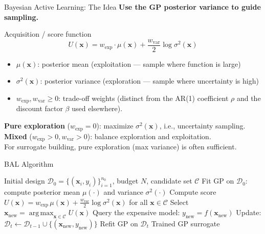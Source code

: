 \documentclass[aspectratio=169,11pt]{beamer}
\newcommand{\emphc}[1]{\textcolor{harvardcrimson}{#1}}
\newcommand{\x}{\bm{x}}
\DeclareMathOperator*{\argmax}{arg\,max}
\begin{document}
\begin{frame}{Bayesian Active Learning: The Idea}
\textbf{Use the GP posterior variance to guide sampling.}

\vspace{0.2cm}
\begin{block}{Acquisition / score function}
\vspace{-4pt}
\[
U(\x) = w_{\mathrm{exp}} \cdot \mu(\x) + \frac{w_{\mathrm{var}}}{2}\log\sigma^2(\x)
\]
\vspace{-8pt}
\begin{itemize}\setlength{\itemsep}{1pt}
  \item $\mu(\x)$: posterior mean (\emphc{exploitation} --- sample where function is large)
  \item $\sigma^2(\x)$: posterior variance (\emphc{exploration} --- sample where uncertainty is high)
  \item $w_{\mathrm{exp}}, w_{\mathrm{var}} \geq 0$: trade-off weights (distinct from the AR(1) coefficient $\rho$ and the discount factor $\beta$ used elsewhere).
\end{itemize}
\end{block}

\vspace{0.2cm}
\textbf{Pure exploration} ($w_{\mathrm{exp}} = 0$): maximize $\sigma^2(\x)$, i.e., uncertainty sampling.\\[3pt]
\textbf{Mixed} ($w_{\mathrm{exp}} > 0, w_{\mathrm{var}} > 0$): balance exploration and exploitation.\\[3pt]
{\small For surrogate building, pure exploration (max variance) is often sufficient.}
\end{frame}

\begin{frame}{BAL Algorithm}
\begin{algorithm}[H]
\caption{Bayesian Active Learning for Surrogates}
\begin{algorithmic}[1]
\REQUIRE Initial design $\mathcal{D}_0 = \{(\x_i, y_i)\}_{i=1}^{n_0}$, budget $N$, candidate set $\mathcal{C}$
\STATE Fit GP on $\mathcal{D}_0$: compute posterior mean $\mu(\cdot)$ and variance $\sigma^2(\cdot)$
    \STATE Compute score $U(\x) = w_{\mathrm{exp}}\,\mu(\x) + \frac{w_{\mathrm{var}}}{2}\log\sigma^2(\x)$ for all $\x \in \mathcal{C}$
    \STATE Select $\x_{\text{new}} = \argmax_{\x \in \mathcal{C}} U(\x)$
    \STATE Query the expensive model: $y_{\text{new}} = f(\x_{\text{new}})$
    \STATE Update: $\mathcal{D}_t \leftarrow \mathcal{D}_{t-1} \cup \{(\x_{\text{new}}, y_{\text{new}})\}$
    \STATE Refit GP on $\mathcal{D}_t$
\ENDFOR
\RETURN Trained GP surrogate
\end{algorithmic}
\end{algorithm}
\end{frame}
\end{document}

